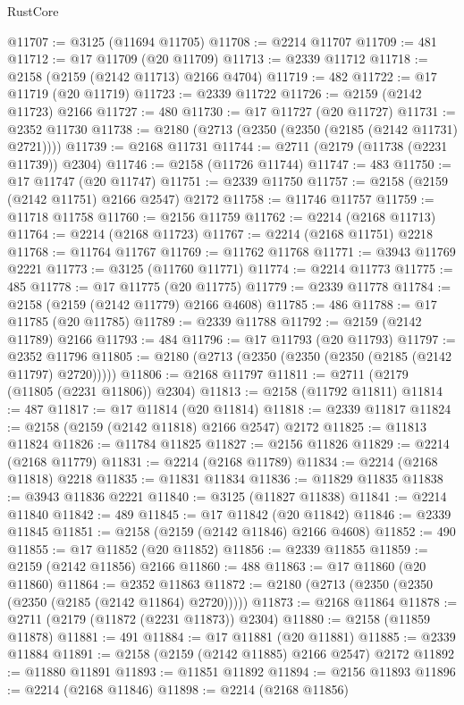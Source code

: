 \begin{lexlean}{RustCore}
\begin{coremodule}
@11707 := @3125 (@11694 @11705)
@11708 := @2214 @11707
@11709 := 481
@11712 := @17 @11709 (@20 @11709)
@11713 := @2339 @11712
@11718 := @2158 (@2159 (@2142 @11713) @2166 @4704)
@11719 := 482
@11722 := @17 @11719 (@20 @11719)
@11723 := @2339 @11722
@11726 := @2159 (@2142 @11723) @2166
@11727 := 480
@11730 := @17 @11727 (@20 @11727)
@11731 := @2352 @11730
@11738 := @2180 (@2713 (@2350 (@2350 (@2185 (@2142 @11731) @2721))))
@11739 := @2168 @11731
@11744 := @2711 (@2179 (@11738 (@2231 @11739)) @2304)
@11746 := @2158 (@11726 @11744)
@11747 := 483
@11750 := @17 @11747 (@20 @11747)
@11751 := @2339 @11750
@11757 := @2158 (@2159 (@2142 @11751) @2166 @2547) @2172
@11758 := @11746 @11757
@11759 := @11718 @11758
@11760 := @2156 @11759
@11762 := @2214 (@2168 @11713)
@11764 := @2214 (@2168 @11723)
@11767 := @2214 (@2168 @11751) @2218
@11768 := @11764 @11767
@11769 := @11762 @11768
@11771 := @3943 @11769 @2221
@11773 := @3125 (@11760 @11771)
@11774 := @2214 @11773
@11775 := 485
@11778 := @17 @11775 (@20 @11775)
@11779 := @2339 @11778
@11784 := @2158 (@2159 (@2142 @11779) @2166 @4608)
@11785 := 486
@11788 := @17 @11785 (@20 @11785)
@11789 := @2339 @11788
@11792 := @2159 (@2142 @11789) @2166
@11793 := 484
@11796 := @17 @11793 (@20 @11793)
@11797 := @2352 @11796
@11805 := @2180 (@2713 (@2350 (@2350 (@2350 (@2185 (@2142 @11797) @2720)))))
@11806 := @2168 @11797
@11811 := @2711 (@2179 (@11805 (@2231 @11806)) @2304)
@11813 := @2158 (@11792 @11811)
@11814 := 487
@11817 := @17 @11814 (@20 @11814)
@11818 := @2339 @11817
@11824 := @2158 (@2159 (@2142 @11818) @2166 @2547) @2172
@11825 := @11813 @11824
@11826 := @11784 @11825
@11827 := @2156 @11826
@11829 := @2214 (@2168 @11779)
@11831 := @2214 (@2168 @11789)
@11834 := @2214 (@2168 @11818) @2218
@11835 := @11831 @11834
@11836 := @11829 @11835
@11838 := @3943 @11836 @2221
@11840 := @3125 (@11827 @11838)
@11841 := @2214 @11840
@11842 := 489
@11845 := @17 @11842 (@20 @11842)
@11846 := @2339 @11845
@11851 := @2158 (@2159 (@2142 @11846) @2166 @4608)
@11852 := 490
@11855 := @17 @11852 (@20 @11852)
@11856 := @2339 @11855
@11859 := @2159 (@2142 @11856) @2166
@11860 := 488
@11863 := @17 @11860 (@20 @11860)
@11864 := @2352 @11863
@11872 := @2180 (@2713 (@2350 (@2350 (@2350 (@2185 (@2142 @11864) @2720)))))
@11873 := @2168 @11864
@11878 := @2711 (@2179 (@11872 (@2231 @11873)) @2304)
@11880 := @2158 (@11859 @11878)
@11881 := 491
@11884 := @17 @11881 (@20 @11881)
@11885 := @2339 @11884
@11891 := @2158 (@2159 (@2142 @11885) @2166 @2547) @2172
@11892 := @11880 @11891
@11893 := @11851 @11892
@11894 := @2156 @11893
@11896 := @2214 (@2168 @11846)
@11898 := @2214 (@2168 @11856)

\end{coremodule}
\end{lexlean}
